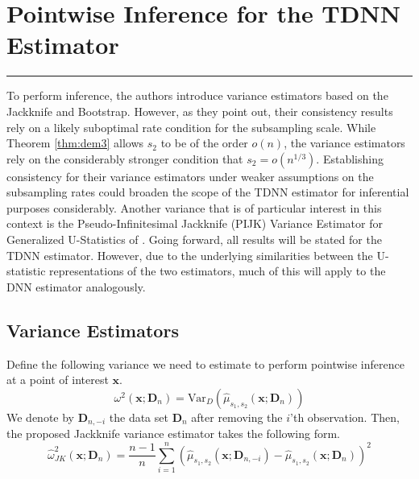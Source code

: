 \documentclass[letterpaper,10pt]{article}
\numberwithin{equation}{section}
\numberwithin{thm}{section}
\numberwithin{lem}{section}
\numberwithin{cor}{section}
\renewcommand{\hat}{\widehat}
\newcommand{\1}{\mathbbm{1}}
\newcommand{\Var}{\text{Var}}
\begin{document}
\newpage
\section{Pointwise Inference for the TDNN Estimator}\label{sec:pw_inf}
\hrule
To perform inference, the authors introduce variance estimators based on the Jackknife and Bootstrap.
However, as they point out, their consistency results rely on a likely suboptimal rate condition for the subsampling scale.
While Theorem \ref{thm:dem3} allows $s_2$ to be of the order $o(n)$, the variance estimators rely on the considerably stronger condition that $s_2 = o(n^{1/3})$.
Establishing consistency for their variance estimators under weaker assumptions on the subsampling rates could broaden the scope of the TDNN estimator for inferential purposes considerably.
Another variance that is of particular interest in this context is the Pseudo-Infinitesimal Jackknife (PIJK) Variance Estimator for Generalized U-Statistics of \citet{peng_bias_2021}.
Going forward, all results will be stated for the TDNN estimator.
However, due to the underlying similarities between the U-statistic representations of the two estimators, much of this will apply to the DNN estimator analogously.

\subsection{Variance Estimators}\label{Var_Ests}

Define the following variance we need to estimate to perform pointwise inference at a point of interest $\mathbf{x}$.
\begin{equation}\label{eq:TDNN_Var}
	\omega^{2}\left(\mathbf{x}; \mathbf{D}_n\right)
	= \Var_{D}\left(\hat{\mu}_{s_1, s_2}\left(\mathbf{x}; \mathbf{D}_n\right)\right)
\end{equation}
We denote by $\mathbf{D}_{n, -i}$ the data set $\mathbf{D}_n$ after removing the $i$'th observation.
Then, the proposed Jackknife variance estimator takes the following form.
\begin{equation}\label{eq:JK_Var_Est}
	\hat{\omega}_{JK}^2\left(\mathbf{x}; \mathbf{D}_n\right)
	= \frac{n-1}{n} \sum_{i = 1}^{n}\left(\hat{\mu}_{s_1, s_2}\left(\mathbf{x}; \mathbf{D}_{n, -i}\right) - \hat{\mu}_{s_1, s_2}\left(\mathbf{x}; \mathbf{D}_{n}\right)\right)^2
\end{equation}
\end{document}
